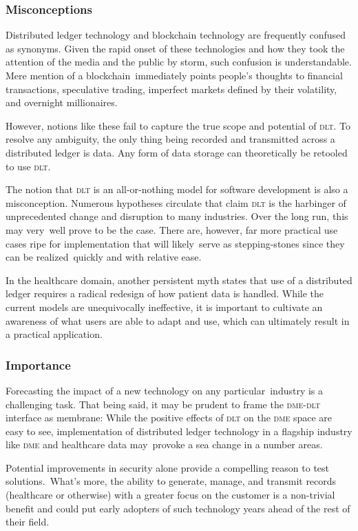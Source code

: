   \subsubsection{Misconceptions}
  Distributed ledger technology and blockchain technology are frequently confused as synonyms. Given the rapid onset of these technologies and how they took the attention of the media and the public by storm, such confusion is understandable. Mere mention of a blockchain immediately points people's thoughts to financial transactions, speculative trading, imperfect markets defined by their volatility, and overnight millionaires.%

  However, notions like these fail to capture the true scope and potential of \textsc{dlt}. To resolve any ambiguity, the only thing being recorded and transmitted across a distributed ledger is data. Any form of data storage can theoretically be retooled to use \textsc{dlt}.%

  The notion that \textsc{dlt} is an all-or-nothing model for software development is also a misconception. Numerous hypotheses circulate that claim \textsc{dlt} is the harbinger of unprecedented change and disruption to many industries. Over the long run, this may very well prove to be the case. There are, however, far more practical use cases ripe for implementation that will likely serve as stepping-stones since they can be realized quickly and with relative ease.%

  In the healthcare domain, another persistent myth states that use of a distributed ledger requires a radical redesign of how patient data is handled. While the current models are unequivocally ineffective, it is important to cultivate an awareness of what users are able to adapt and use, which can ultimately result in a practical application.%

  \subsubsection{Importance}
  Forecasting the impact of a new technology on any particular industry is a challenging task. That being said, it may be prudent to frame the \textsc{dme}-\textsc{dlt} interface as membrane: While the positive effects of \textsc{dlt} on the \textsc{dme} space are easy to see, implementation of distributed ledger technology in a flagship industry like \textsc{dme} and healthcare data may provoke a sea change in a number areas.%

  Potential improvements in security alone provide a compelling reason to test solutions. What's more, the ability to generate, manage, and transmit records (healthcare or otherwise) with a greater focus on the customer is a non-trivial benefit and could put early adopters of such technology years ahead of the rest of their field.%

